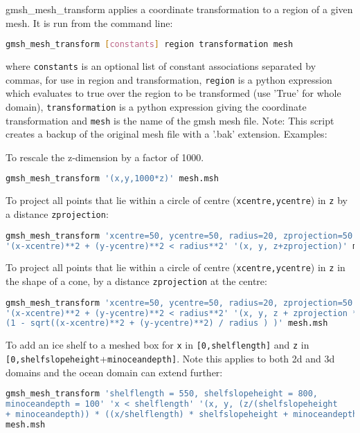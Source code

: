 gmsh\_mesh\_transform applies a coordinate transformation to a region of a given mesh. It is run from the command line:
\begin{lstlisting}[language = Bash]
gmsh_mesh_transform [constants] region transformation mesh
\end{lstlisting}
where \lstinline[language = Bash]+constants+ is an optional list of constant associations separated by commas, for use in region and transformation, \lstinline[language = Bash]+region+ is a python expression which evaluates to true over the region to be transformed (use 'True' for whole domain), \lstinline[language = Bash]+transformation+ is a python expression giving the coordinate transformation and \lstinline[language = Bash]+mesh+ is the name of the gmsh mesh file.
Note: This script creates a backup of the original mesh file with a '.bak' extension.
Examples:

To rescale the z-dimension by a factor of 1000.
\begin{lstlisting}[language = Bash]
gmsh_mesh_transform '(x,y,1000*z)' mesh.msh
\end{lstlisting} 

To project all points that lie within a circle of centre (\lstinline[language = Bash]+xcentre,ycentre+) in \lstinline[language = Bash]+z+ by a distance \lstinline[language = Bash]+zprojection+:
\begin{lstlisting}[language = Bash]
gmsh_mesh_transform 'xcentre=50, ycentre=50, radius=20, zprojection=50'
'(x-xcentre)**2 + (y-ycentre)**2 < radius**2' '(x, y, z+zprojection)' mesh.msh
\end{lstlisting} 

To project all points that lie within a circle of centre (\lstinline[language = Bash]+xcentre,ycentre+) in \lstinline[language = Bash]+z+ in the shape of a cone, by a distance \lstinline[language = Bash]+zprojection+ at the centre:
\begin{lstlisting}[language = Bash]
gmsh_mesh_transform 'xcentre=50, ycentre=50, radius=20, zprojection=50'
'(x-xcentre)**2 + (y-ycentre)**2 < radius**2' '(x, y, z + zprojection *
(1 - sqrt((x-xcentre)**2 + (y-ycentre)**2) / radius ) )' mesh.msh
\end{lstlisting} 

To add an ice shelf to a meshed box for \lstinline[language = Bash]+x+ in \lstinline[language = Bash]+[0,shelflength]+ and \lstinline[language = Bash]+z+ in \lstinline[language = Bash]+[0,shelfslopeheight++\lstinline[language = Bash]+minoceandepth]+. Note this applies to both 2d and 3d domains and the ocean domain can extend further:
\begin{lstlisting}[language = Bash]
gmsh_mesh_transform 'shelflength = 550, shelfslopeheight = 800, 
minoceandepth = 100' 'x < shelflength' '(x, y, (z/(shelfslopeheight 
+ minoceandepth)) * ((x/shelflength) * shelfslopeheight + minoceandepth))' 
mesh.msh
\end{lstlisting}

